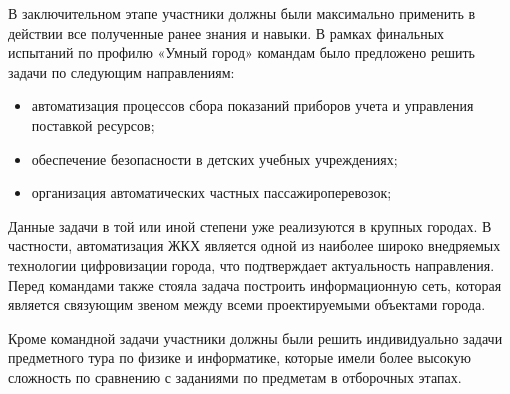 В заключительном этапе участники должны были максимально применить в действии все полученные ранее знания и навыки. В рамках финальных испытаний по профилю «Умный город» командам было предложено решить задачи по следующим направлениям:
\begin{itemize}
    \item автоматизация процессов сбора показаний приборов учета и управления поставкой ресурсов;
    \item обеспечение безопасности в детских учебных учреждениях;
    \item организация автоматических частных пассажироперевозок;
\end{itemize}

Данные задачи в той или иной степени уже реализуются в крупных городах. В частности, автоматизация ЖКХ является одной из наиболее широко внедряемых технологии цифровизации города, что подтверждает актуальность направления. Перед командами также стояла задача построить информационную сеть, которая является связующим звеном между всеми проектируемыми объектами города.

Кроме командной задачи участники должны были решить индивидуально задачи предметного тура по физике и информатике, которые имели более высокую сложность по сравнению с заданиями по предметам в отборочных этапах.